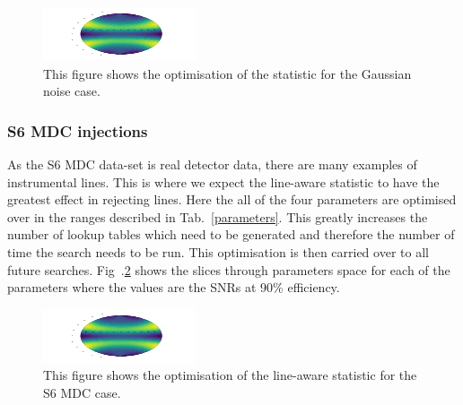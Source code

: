 \begin{figure}
    \centering
    \includegraphics[width=\linewidth]{testimg.png}
    \caption{This figure shows the optimisation of the statistic for the Gaussian noise case.}
    \label{viterbi:optimisation:gauss}
\end{figure}


\subsubsection{S6 MDC injections}

As the S6 \ac{MDC} data-set is real detector data, there are many examples of instrumental lines. 
This is where we expect the line-aware statistic to have the greatest effect in rejecting lines. 
Here the all of the four parameters are optimised over in the ranges described in Tab.~\ref{parameters}. 
This greatly increases the number of lookup tables which need to be generated and therefore the number of time the search needs to be run. This optimisation is then carried over to all future searches.
Fig~.\ref{viterbi:optimisation:s6mdc} shows the slices through parameters space for each of the parameters where the values are the \acp{SNR} at 90\% efficiency.  

\begin{figure}
    \centering
    \includegraphics[width=\linewidth]{testimg.png}
    \caption{This figure shows the optimisation of the line-aware statistic for the S6 \ac{MDC} case.}
    \label{viterbi:optimisation:s6mdc}
\end{figure}

